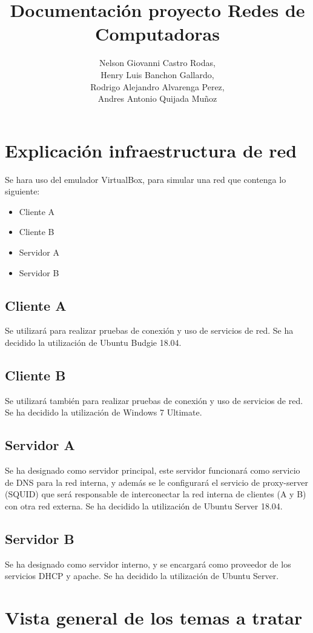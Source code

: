 \documentclass[12pt]{report}
\title{Documentación proyecto Redes de Computadoras}
\author{Nelson Giovanni Castro Rodas, \\ Henry Luis Banchon Gallardo, \\ Rodrigo Alejandro Alvarenga Perez, \\ Andres Antonio Quijada Muñoz}
\begin{document}
        \maketitle

        \newpage
        \section*{Explicación infraestructura de red}
        Se hara uso del emulador VirtualBox, para simular una red que contenga lo siguiente:
        \begin{itemize}
            \item Cliente A
            \item Cliente B
            \item Servidor A
            \item Servidor B
        \end{itemize}
        \subsection*{Cliente A}
        Se utilizará para realizar pruebas de conexión y uso de servicios de red. Se ha decidido la utilización de Ubuntu Budgie 18.04.
        \subsection*{Cliente B}
        Se utilizará también para realizar pruebas de conexión y uso de servicios de red. Se ha decidido la utilización de Windows 7 Ultimate.
        \subsection*{Servidor A}
        Se ha designado como servidor principal, este servidor funcionará como servicio de DNS para la red interna, y además se le configurará el servicio de proxy-server (SQUID) que será responsable de interconectar la red interna de clientes (A y B) con otra red externa. 
        Se ha decidido la utilización de Ubuntu Server 18.04.
        \subsection*{Servidor B}
        Se ha designado como servidor interno, y se encargará como proveedor de los servicios DHCP y apache. Se ha decidido la utilización de Ubuntu Server.
        \section*{Vista general de los temas a tratar}
\end{document}
